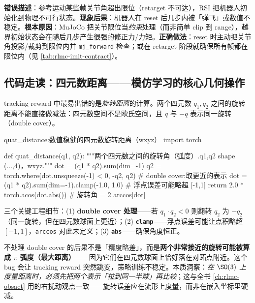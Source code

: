 \begin{pitfall}
\textbf{错误描述}：参考运动某些帧关节角超出限位（retarget 不可达），RSI 把机器人初始化到物理不可行状态。\textbf{现象后果}：机器人在 reset 后几步内被「弹飞」或数值不稳定。\textbf{根本原因}：MuJoCo 把关节限位当\emph{约束}处理（而非简单 clip 到 range），越界初始状态会在随后几步产生很强的修正力/力矩。\textbf{正确做法}：reset 时主动把关节角投影/裁剪到限位内并 \verb|mj_forward| 检查；或在 retarget 阶段就确保所有帧都在限位内（见 \cref{tab:rlmc-imit-contract}）。
\end{pitfall}

\subsection{代码走读：四元数距离——模仿学习的核心几何操作}
\label{sec:rlmc-imit-track-quat}

tracking reward 中最易出错的是\emph{旋转距离}的计算。两个四元数 $q_1,q_2$ 之间的旋转距离不能直接做减法：四元数空间不是欧氏空间，且 $q$ 与 $-q$ 表示同一旋转（double cover）。

\begin{codebox}[Python]{quat\_distance:数值稳健的四元数旋转距离（wxyz）}
import torch

def quat_distance(q1, q2):
    """两个四元数之间的旋转角（弧度）.q1,q2 shape (...,4)，wxyz."""
    dot = (q1 * q2).sum(dim=-1)
    q2 = torch.where(dot.unsqueeze(-1) < 0, -q2, q2)   # double cover:取更近的表示
    dot = (q1 * q2).sum(dim=-1).clamp(-1.0, 1.0)       # 浮点误差可能略超 [-1,1]
    return 2.0 * torch.acos(dot.abs())                 # 旋转角 = 2 arccos|dot|
\end{codebox}

三个关键工程细节：(1) \textbf{double cover 处理}——若 $q_1\cdot q_2<0$ 则翻转 $q_2$ 为 $-q_2$（同一旋转，但在四元数球面上更近）；(2) \textbf{\texttt{clamp}}——浮点误差可能让点积略超 $[-1,1]$，\texttt{arccos} 对此未定义；(3) \textbf{\texttt{abs}}——确保角度恒正。

\begin{insight}\label{ins:rlmc-imit-doublecover}
不处理 double cover 的后果不是「精度略差」，而是\textbf{两个非常接近的旋转可能被算成 $\pi$ 弧度（最大距离）}——因为它们在四元数球面上恰好落在对跖点附近。这个 bug 会让 tracking reward 突然跳变，策略训练不稳定。本质洞察：\emph{在 $\SO(3)$ 上度量距离时，必须先把两个表示「拉到同一半球」再比较}；这与全书 \cref{ch:rlmc-obsact} 用的右扰动观点一致——旋转误差应在流形上度量，而非在嵌入坐标里硬减。
\end{insight}

